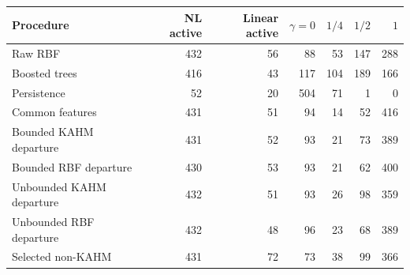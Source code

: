 \begin{tabular}{@{}lrrrrrr@{}}
\toprule
Procedure & NL active & Linear active & $\gamma=0$ & $1/4$ & $1/2$ & $1$ \\
\midrule
Raw RBF & 432 & 56 & 88 & 53 & 147 & 288 \\
Boosted trees & 416 & 43 & 117 & 104 & 189 & 166 \\
Persistence & 52 & 20 & 504 & 71 & 1 & 0 \\
Common features & 431 & 51 & 94 & 14 & 52 & 416 \\
Bounded KAHM departure & 431 & 52 & 93 & 21 & 73 & 389 \\
Bounded RBF departure & 430 & 53 & 93 & 21 & 62 & 400 \\
Unbounded KAHM departure & 432 & 51 & 93 & 26 & 98 & 359 \\
Unbounded RBF departure & 432 & 48 & 96 & 23 & 68 & 389 \\
Selected non-KAHM & 431 & 72 & 73 & 38 & 99 & 366 \\
\bottomrule
\end{tabular}
